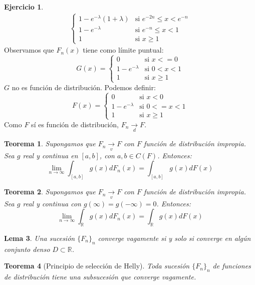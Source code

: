 \documentclass{report}
\newtheorem{theorem}{Teorema}[chapter]
\newtheorem{lemma}[theorem]{Lema}
\theoremstyle{remark}
\theoremstyle{remark}
\theoremstyle{remark}
\theoremstyle{definition}
\theoremstyle{definition}
\theoremstyle{definition}
\theoremstyle{definition}
\newtheorem*{exercise}{Ejercicio}
\begin{document}
\begin{exercise}
\begin{align*}
\begin{cases}
                       1 - e^{-\lambda}(1+\lambda) & \text{si } e^{-2n} \leq x < e^{-n} \\
                       1 - e^{-\lambda}            & \text{si } e^{-n} \leq x < 1       \\
                       1                           & \text{si } x \geq 1
                   \end{cases}
    \end{align*}
    Observamos que $F_n(x)$ tiene como límite puntual:
    $$G(x) = \begin{cases}
            0              & \text{si } x <= 0    \\
            1-e^{-\lambda} & \text{si } 0 < x < 1 \\
            1              & \text{si } x \geq 1
        \end{cases}$$
    $G$ no es función de distribución.
    Podemos definir:
    $$F(x) = \begin{cases}
            0              & \text{si } x < 0      \\
            1-e^{-\lambda} & \text{si } 0 <= x < 1 \\
            1              & \text{si } x \geq 1
        \end{cases}$$
    Como $F$ sí es función de distribución, $F_n \xrightarrow[d]{} F$.
\end{exercise}

\begin{theorem}
    Supongamos que $F_n \xrightarrow[v]{} F$ con $F$ función de distribución impropia.
    Sea $g$ real y continua en $[a, b]$, con $a, b \in C(F)$. Entonces:
    $$\lim\limits_{n \to \infty} \int_{[a,b]} g(x)dF_n(x) = \int_{[a,b]} g(x)dF(x)$$
\end{theorem}

\begin{theorem}
    Supongamos que $F_n \xrightarrow[v]{} F$ con $F$ función de distribución impropia.
    Sea $g$ real y continua con $g(\infty) = g(-\infty) = 0$. Entonces:
    $$\lim\limits_{n \to \infty} \int_\mathbb{R} g(x)dF_n(x) = \int_\mathbb{R} g(x)dF(x)$$
\end{theorem}

\begin{lemma}
    Una sucesión $\{F_n\}_n$ converge vagamente si y solo si converge en algún conjunto denso $D \subset \mathbb{R}$.
\end{lemma}

\begin{theorem}[Principio de selección de Helly]
    Toda sucesión $\{F_n\}_n$ de funciones de distribución tiene una subsucesión que converge vagamente.
\end{theorem}
\end{document}
